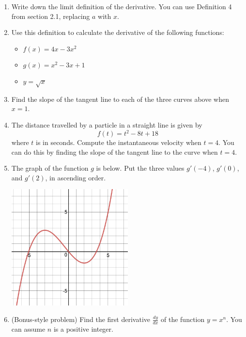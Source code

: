 \documentclass[11pt]{article}
\begin{document}
\begin{enumerate}
    \item Write down the limit definition of the derivative. You can use Definition 4 from section 2.1, replacing $a$ with $x$.
    \item Use this definition to calculate the derivative of the following functions:
    \begin{itemize}
        \item $f(x) = 4x - 3x^2$
        \item $g(x) = x^2 - 3x +1$
        \item $y = \sqrt{x}$
    \end{itemize}
    \item Find the slope of the tangent line to each of the three curves above when $x = 1$.
    \item The distance travelled by a particle in a straight line is given by $$f(t) = t^2 - 8t + 18$$ where $t$ is in seconds. Compute the instantaneous velocity when $t = 4$. You can do this by finding the slope of the tangent line to the curve when $t = 4.$
    \item The graph of the function $g$ is below. Put the three values  $g'(-4)$, $g'(0)$, and $g'(2)$, in ascending order.\\
    \begin{center}
            \includegraphics[width=0.5\textwidth]{1_4_graph}
    \end{center}
    \item (Bonus-style problem) Find the first derivative $\frac{dy}{dx}$ of the function $y = x^n$. You can assume $n$ is a positive integer.
\end{enumerate}
\end{document}
